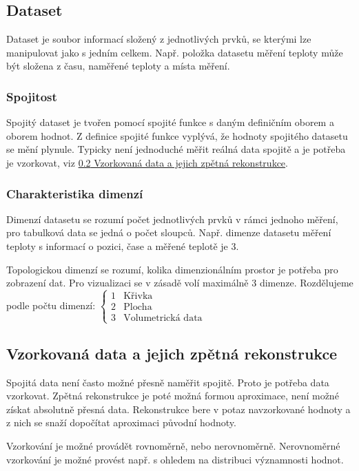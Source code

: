 \documentclass[10pt,a4paper, table]{article}
\begin{document}
\subsection{Dataset}
Dataset je soubor informací složený z jednotlivých prvků, se kterými lze manipulovat jako s jedním celkem. Např. položka datasetu měření teploty může být složena z času, naměřené teploty a místa měření.

\subsubsection{Spojitost}
Spojitý dataset je tvořen pomocí spojité funkce s daným definičním oborem a oborem hodnot. Z definice spojité funkce vyplývá, že hodnoty spojitého datasetu se mění plynule. Typicky není jednoduché měřit reálná data spojitě a je potřeba je vzorkovat, viz \hyperref[sec:sampling]{\ref{sec:sampling} Vzorkovaná data a jejich zpětná rekonstrukce}.

\subsubsection{Charakteristika dimenzí}
Dimenzí datasetu se rozumí počet jednotlivých prvků v rámci jednoho měření, pro tabulková data se jedná o počet sloupců. Např. dimenze datasetu měření teploty s informací o pozici, čase a měřené teplotě je 3.\par
Topologickou dimenzí se rozumí, kolika dimenzionálním prostor je potřeba pro zobrazení dat. Pro vizualizaci se v zásadě volí maximálně 3 dimenze. Rozdělujeme podle počtu dimenzí:
$\left\{\begin{matrix}
    1 & \textrm{Křivka}            \\
    2 & \textrm{Plocha}            \\
    3 & \textrm{Volumetrická data}
  \end{matrix}\right.$

\subsection{Vzorkovaná data a jejich zpětná rekonstrukce} \label{sec:sampling}
Spojitá data není často možné přesně naměřit spojitě. Proto je potřeba data vzorkovat. Zpětná rekonstrukce je poté možná formou aproximace, není možné získat absolutně přesná data. Rekonstrukce bere v potaz navzorkované hodnoty a z nich se snaží dopočítat aproximaci původní hodnoty. \par
Vzorkování je možné provádět rovnoměrně, nebo nerovnoměrně. Nerovnoměrné vzorkování je možné provést např. s ohledem na distribuci významnosti hodnot.
\end{document}
